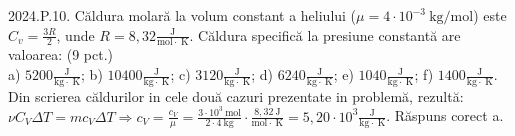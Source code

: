 2024.P.10. Căldura molară la volum constant a heliului ($\mu=4 \cdot 10^{-3} \mathrm{~kg} / \mathrm{mol}$) este $C_{v}=\frac{3 R}{2}$, unde $R=8,32 \frac{\mathrm{J}}{\mathrm{mol} \cdot \mathrm{~K}}$. Căldura specifică la presiune constantă are valoarea: (9 pct.)\\ a) $5200 \frac{\mathrm{J}}{\mathrm{kg} \cdot \mathrm{~K}}$; b) $10400 \frac{\mathrm{J}}{\mathrm{kg} \cdot \mathrm{~K}}$; c) $3120 \frac{\mathrm{J}}{\mathrm{kg} \cdot \mathrm{~K}}$; d) $6240 \frac{\mathrm{J}}{\mathrm{kg} \cdot \mathrm{~K}}$; e) $1040 \frac{\mathrm{J}}{\mathrm{kg} \cdot \mathrm{~K}}$; f) $1400 \frac{\mathrm{J}}{\mathrm{kg} \cdot \mathrm{~K}}$.\\ Din scrierea căldurilor in cele două cazuri prezentate in problemă, rezultă:\\ $\nu C_{V} \Delta T=m c_{V} \Delta T \Rightarrow c_{V}=\frac{c_{V}}{\mu}=\frac{3 \cdot 10^{3} \mathrm{~mol}}{2 \cdot 4 \mathrm{~kg}} \cdot \frac{8,32 \mathrm{~J}}{\mathrm{mol} \cdot \mathrm{~K}}=5,20 \cdot 10^{3} \frac{\mathrm{J}}{\mathrm{kg} \cdot \mathrm{~K}}$. Răspuns corect a.\\
